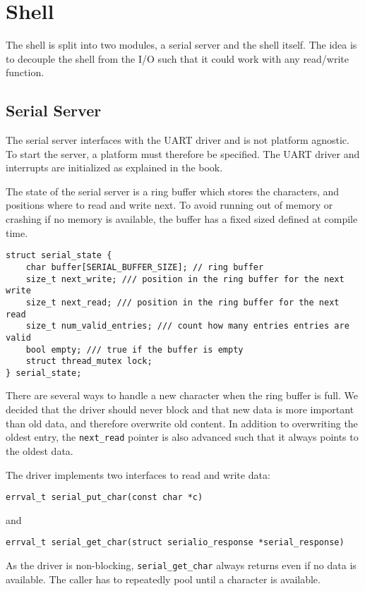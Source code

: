 \chapter{Shell}
The shell is split into two modules, a serial server and the shell itself. The idea is to decouple the shell from the I/O such that it could work with any read/write function.

\section{Serial Server}
The serial server interfaces with the UART driver and is not platform agnostic. To start the server, a platform must therefore be specified. The UART driver and interrupts are initialized as explained in the book.

The state of the serial server is a ring buffer which stores the characters, and positions where to read and write next. To avoid running out of memory or crashing if no memory is available, the buffer has a fixed sized defined at compile time.

\begin{verbatim}
struct serial_state {
    char buffer[SERIAL_BUFFER_SIZE]; // ring buffer
    size_t next_write; /// position in the ring buffer for the next write
    size_t next_read; /// position in the ring buffer for the next read
    size_t num_valid_entries; /// count how many entries entries are valid
    bool empty; /// true if the buffer is empty
    struct thread_mutex lock;
} serial_state;
\end{verbatim}

There are several ways to handle a new character when the ring buffer is full. We decided that the driver should never block and that new data is more important than old data, and therefore overwrite old content. In addition to overwriting the oldest entry, the \verb|next_read| pointer is also advanced such that it always points to the oldest data.

The driver implements two interfaces to read and write data: 
\begin{verbatim}
errval_t serial_put_char(const char *c)
\end{verbatim}
and
\begin{verbatim}
errval_t serial_get_char(struct serialio_response *serial_response)
\end{verbatim}

As the driver is non-blocking, \verb|serial_get_char| always returns even if no data is available. The caller has to repeatedly pool until a character is available.

